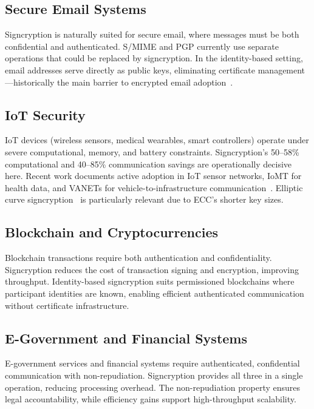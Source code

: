 \documentclass[11pt,a4paper]{article}
\begin{document}
\subsection{Secure Email Systems}

Signcryption is naturally suited for secure email, where messages must be both confidential and authenticated. S/MIME and PGP currently use separate operations that could be replaced by signcryption. In the identity-based setting, email addresses serve directly as public keys, eliminating certificate management---historically the main barrier to encrypted email adoption~\cite{malonelee2002, boyen2003}.

\subsection{IoT Security}

IoT devices (wireless sensors, medical wearables, smart controllers) operate under severe computational, memory, and battery constraints. Signcryption's 50--58\% computational and 40--85\% communication savings are operationally decisive here. Recent work documents active adoption in IoT sensor networks, IoMT for health data, and VANETs for vehicle-to-infrastructure communication~\cite{iotsigncryption2025}. Elliptic curve signcryption~\cite{zheng1998} is particularly relevant due to ECC's shorter key sizes.

\subsection{Blockchain and Cryptocurrencies}

Blockchain transactions require both authentication and confidentiality. Signcryption reduces the cost of transaction signing and encryption, improving throughput. Identity-based signcryption suits permissioned blockchains where participant identities are known, enabling efficient authenticated communication without certificate infrastructure.

\subsection{E-Government and Financial Systems}

E-government services and financial systems require authenticated, confidential communication with non-repudiation. Signcryption provides all three in a single operation, reducing processing overhead. The non-repudiation property ensures legal accountability, while efficiency gains support high-throughput scalability.
\end{document}
